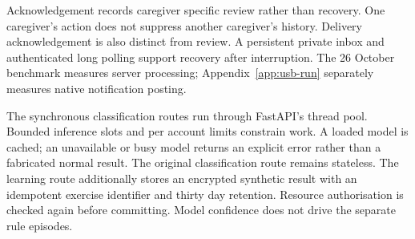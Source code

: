 \begin{reportprose}
Acknowledgement records caregiver specific review rather than recovery. One caregiver's action does not suppress another caregiver's history. Delivery acknowledgement is also distinct from review. A persistent private inbox and authenticated long polling support recovery after interruption. The 26 October benchmark measures server processing; Appendix~\ref{app:usb-run} separately measures native notification posting.

The synchronous classification routes run through FastAPI's thread pool.\cite{fastapi} Bounded inference slots and per account limits constrain work. A loaded model is cached; an unavailable or busy model returns an explicit error rather than a fabricated normal result. The original classification route remains stateless. The learning route additionally stores an encrypted synthetic result with an idempotent exercise identifier and thirty day retention. Resource authorisation is checked again before committing. Model confidence does not drive the separate rule episodes.
\end{reportprose}
\SequenceDiagram
\AlertStateDiagram

